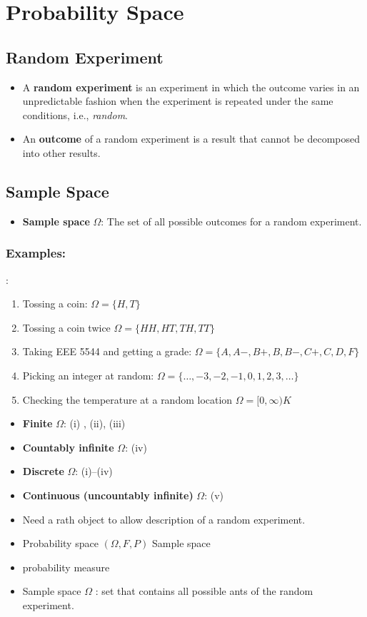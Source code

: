 \section{Probability Space}

\subsection{Random Experiment}
\begin{itemize}
\item A \textbf{random experiment} is an experiment in which the
outcome varies in an unpredictable fashion when the experiment is
repeated under the same conditions, i.e., \emph{random}.
\item An \textbf{outcome} of a random experiment is a result that
cannot be decomposed into other results.
\end{itemize}

\subsection{Sample Space}
\begin{itemize}
\item \textbf{Sample space} \(\Omega\): The set of all possible outcomes for a random experiment.
\end{itemize}

\subsubsection{Examples:}:
\begin{enumerate}[label=(\roman*)]
\item Tossing a coin: \(\Omega=\{H, T\}\)
\item Tossing a coin twice \(\Omega=\{H H, H T, T H, T T\}\)
\item Taking EEE 5544 and getting a grade:
\(
\Omega=\{A, A-, B+, B, B-, C+, C, D, F\}
\)
\item Picking an integer at random:
\(\Omega=\{\ldots,-3,-2,-1,0,1,2,3, \ldots \}\)
\item Checking the temperature at a random location
\(
\Omega=[0, \infty) K
\)
\end{enumerate}

\begin{itemize}
\item \textbf{Finite} \(\Omega\): (i) , (ii), (iii)
\item \textbf{Countably infinite} \(\Omega\): (iv)
\item \textbf{Discrete} \(\Omega\):  (i)--(iv)
\item \textbf{Continuous (uncountably infinite)} \(\Omega\):  (v)
\end{itemize}



\begin{itemize}
  \item[-] Need a rath object to allow description of a random experiment.
  \item[-] Probability space \((\Omega, F, P)\) Sample space
  \item[] probability measure
  \item[-] Sample space \(\Omega\) : set that contains all possible ants of the random experiment.
\end{itemize}
